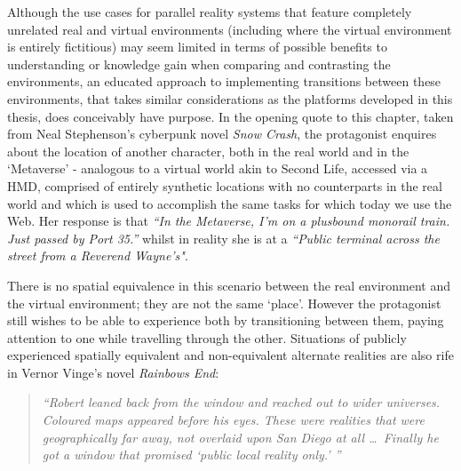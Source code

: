 Although the use cases for parallel reality systems that feature completely unrelated real and virtual environments (including where the virtual environment is entirely fictitious) may seem limited in terms of possible benefits to understanding or knowledge gain when comparing and contrasting the environments, an educated approach to implementing transitions between these environments, that takes similar considerations as the platforms developed in this thesis, does conceivably have purpose. In the opening quote to this chapter, taken from Neal Stephenson's cyberpunk novel \textit{Snow Crash}, the protagonist enquires about the location of another character, both in the real world and in the `Metaverse' - analogous to a virtual world akin to Second Life, accessed via a HMD, comprised of entirely synthetic locations with no counterparts in the real world and which is used to accomplish the same tasks for which today we use the Web. Her response is that \textit{``In  the Metaverse, I'm on a plusbound monorail train. Just passed by Port 35.''} whilst in reality she is at a \textit{``Public terminal across the street from a Reverend Wayne's"}.

There is no spatial equivalence in this scenario between the real environment and the virtual environment; they are not the same `place'. However the protagonist still wishes to be able to experience both by transitioning between them, paying attention to one while travelling through the other. Situations of publicly experienced spatially equivalent and non-equivalent alternate realities are also rife in Vernor Vinge's novel \textit{Rainbows End}:

\begin{quote}
	\textit{``Robert leaned back from the window and reached out to wider universes. Coloured maps appeared before his eyes. These were realities that were geographically far away, not overlaid upon San Diego at all \ldots\ Finally he got a window that promised `public local reality only.' ''}~\cite{Vinge2006}
\end{quote}

